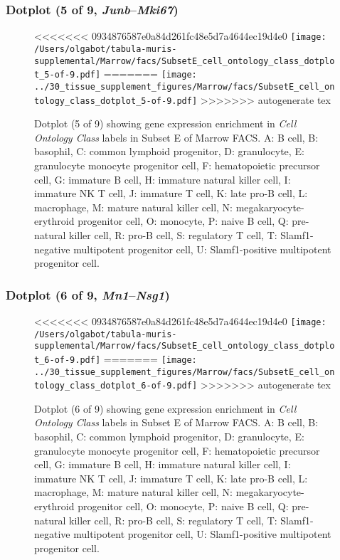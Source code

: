 \clearpage

\subsubsection{Dotplot (5 of 9, \emph{Junb}--\emph{Mki67})}
\begin{figure}[h]
\centering
<<<<<<< 0934876587e0a84d261fc48e5d7a4644ec19d4e0
\texttt{[image: /Users/olgabot/tabula-muris-supplemental/Marrow/facs/SubsetE\_cell\_ontology\_class\_dotplot\_5-of-9.pdf]}
=======
\texttt{[image: ../30\_tissue\_supplement\_figures/Marrow/facs/SubsetE\_cell\_ontology\_class\_dotplot\_5-of-9.pdf]}
>>>>>>> autogenerate tex

\caption{ Dotplot (5 of 9)  showing gene expression enrichment in \emph{Cell Ontology Class} labels in Subset E of Marrow FACS. A: B cell, B: basophil, C: common lymphoid progenitor, D: granulocyte, E: granulocyte monocyte progenitor cell, F: hematopoietic precursor cell, G: immature B cell, H: immature natural killer cell, I: immature NK T cell, J: immature T cell, K: late pro-B cell, L: macrophage, M: mature natural killer cell, N: megakaryocyte-erythroid progenitor cell, O: monocyte, P: naive B cell, Q: pre-natural killer cell, R: pro-B cell, S: regulatory T cell, T: Slamf1-negative multipotent progenitor cell, U: Slamf1-positive multipotent progenitor cell.}
\end{figure}


\clearpage

\subsubsection{Dotplot (6 of 9, \emph{Mn1}--\emph{Nsg1})}
\begin{figure}[h]
\centering
<<<<<<< 0934876587e0a84d261fc48e5d7a4644ec19d4e0
\texttt{[image: /Users/olgabot/tabula-muris-supplemental/Marrow/facs/SubsetE\_cell\_ontology\_class\_dotplot\_6-of-9.pdf]}
=======
\texttt{[image: ../30\_tissue\_supplement\_figures/Marrow/facs/SubsetE\_cell\_ontology\_class\_dotplot\_6-of-9.pdf]}
>>>>>>> autogenerate tex

\caption{ Dotplot (6 of 9)  showing gene expression enrichment in \emph{Cell Ontology Class} labels in Subset E of Marrow FACS. A: B cell, B: basophil, C: common lymphoid progenitor, D: granulocyte, E: granulocyte monocyte progenitor cell, F: hematopoietic precursor cell, G: immature B cell, H: immature natural killer cell, I: immature NK T cell, J: immature T cell, K: late pro-B cell, L: macrophage, M: mature natural killer cell, N: megakaryocyte-erythroid progenitor cell, O: monocyte, P: naive B cell, Q: pre-natural killer cell, R: pro-B cell, S: regulatory T cell, T: Slamf1-negative multipotent progenitor cell, U: Slamf1-positive multipotent progenitor cell.}
\end{figure}



